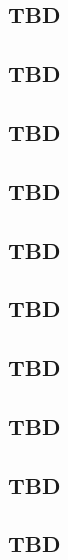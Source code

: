 \subsection{TBD}

\subsection{TBD}

\subsection{TBD}

\subsection{TBD}

\subsection{TBD}

\subsection{TBD}

\subsection{TBD}

\subsection{TBD}

\subsection{TBD}

\subsection{TBD}